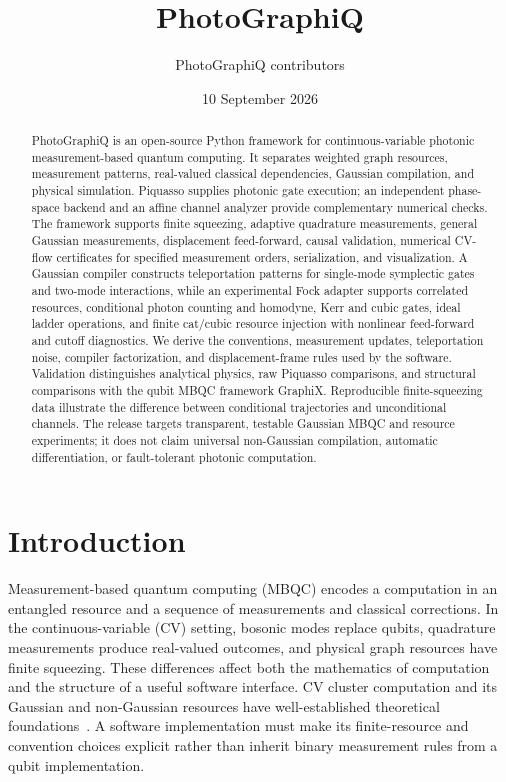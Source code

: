 \documentclass[a4paper,twocolumn,11pt,nopdfoutputerror]{quantumarticle}
\title{PhotoGraphiQ}
\author{PhotoGraphiQ contributors}
\affiliation{Software manuscript draft; individual authors and affiliations to be confirmed.}
\date{10 September 2026}
\begin{document}
\maketitle

\begin{abstract}
PhotoGraphiQ is an open-source Python framework for continuous-variable photonic
measurement-based quantum computing. It separates weighted graph resources,
measurement patterns, real-valued classical dependencies, Gaussian compilation,
and physical simulation. Piquasso supplies photonic gate execution; an independent
phase-space backend and an affine channel analyzer provide complementary numerical
checks. The framework supports finite squeezing, adaptive quadrature measurements,
general Gaussian measurements, displacement feed-forward, causal validation,
numerical CV-flow certificates for specified measurement orders, serialization,
and visualization. A Gaussian compiler constructs teleportation patterns for
single-mode symplectic gates and two-mode interactions, while an experimental
Fock adapter supports correlated resources, conditional photon counting and
homodyne, Kerr and cubic gates, ideal ladder operations, and finite cat/cubic
resource injection with nonlinear feed-forward and cutoff diagnostics. We derive the conventions, measurement updates, teleportation
noise, compiler factorization, and displacement-frame rules used by the software.
Validation distinguishes analytical physics, raw Piquasso comparisons, and
structural comparisons with the qubit MBQC framework GraphiX. Reproducible
finite-squeezing data illustrate the difference between conditional trajectories
and unconditional channels. The release targets transparent, testable Gaussian
MBQC and resource experiments; it does not claim universal non-Gaussian
compilation, automatic differentiation, or fault-tolerant photonic computation.
\end{abstract}

\section{Introduction}

Measurement-based quantum computing (MBQC) encodes a computation in an entangled
resource and a sequence of measurements and classical corrections. In the
continuous-variable (CV) setting, bosonic modes replace qubits, quadrature
measurements produce real-valued outcomes, and physical graph resources have
finite squeezing. These differences affect both the mathematics of computation
and the structure of a useful software interface. CV cluster computation and its
Gaussian and non-Gaussian resources have well-established theoretical
foundations~\cite{menicucci2006,gu2009}. A software implementation must make its
finite-resource and convention choices explicit rather than inherit binary
measurement rules from a qubit implementation.
\end{document}
